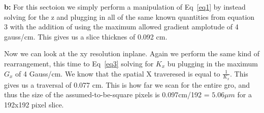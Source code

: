 \documentclass[12pt]{article}
\begin{document}
\noindent\textbf{b: }
For this sectoion we simply perform a manipulation of Eq~\ref{eq1} by instead solving for the z and plugging in all of the same known quantities from equation 3 with the addition of using the maximum allowed gradient amplotude of 4 gauss/cm. This gives us a slice thicknes of 0.092 cm.

Now we can look at the xy resolution inplane. Again we perform the same kind of rearrangement, this time to Eq~\ref{eq3} solving for $K_x$ bu plugging in the maximum $G_x$ of 4 Gauss/cm. We know that the spatial X traveresed is equal to $\frac{1}{K_x}$. This gives us a traversal of 0.077 cm. This is how far we scan for the entire gro, and thus the size of the assumed-to-be-square pixels is 0.097cm/192 = $5.06\mu m$ for a 192x192 pixel slice.
\end{document}
